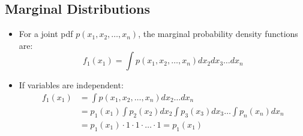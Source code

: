 \subsection{Marginal Distributions}
\begin{itemize}
      \item For a joint pdf $p(x_1, x_2, \ldots, x_n)$, the marginal probability density functions are:
            \[ f_1(x_1) = \int p(x_1, x_2, \ldots, x_n) dx_2 dx_3 \ldots dx_n \]

      \item If variables are independent:
            \begin{align*}
                  f_1(x_1) & = \int p(x_1, x_2, \ldots, x_n) dx_2 \ldots dx_n                           \\
                           & = p_1(x_1) \int p_2(x_2) dx_2 \int p_3(x_3) dx_3 \ldots \int p_n(x_n) dx_n \\
                           & = p_1(x_1) \cdot 1 \cdot 1 \cdot \ldots \cdot 1 = p_1(x_1)
            \end{align*}
\end{itemize}

